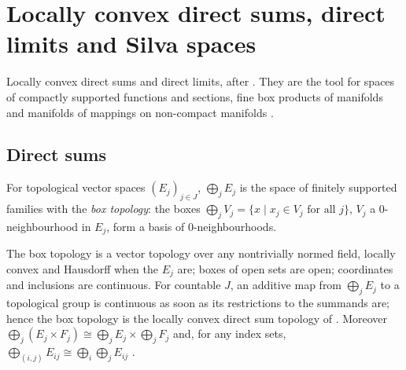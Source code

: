 \chapter{Locally convex direct sums, direct limits and Silva spaces}
\label{chap:directsums}

Locally convex direct sums and direct limits, after \cite[Appendix~B.13 and Sections~2.7--2.8]{GN26}.
They are the tool for spaces of compactly supported functions and sections, fine box products of
manifolds and manifolds of mappings on non-compact manifolds \cite[Sections~4.3--4.4]{GN26}.

\section{Direct sums}

\begin{definition}
  \label{def:ds-direct-sum}
  \leanok
  For topological vector spaces $(E_j)_{j \in J}$, $\bigoplus_j E_j$ is the space of finitely
  supported families with the \emph{box topology}: the boxes
  $\bigoplus_j V_j = \{x \mid x_j \in V_j \text{ for all } j\}$, $V_j$ a $0$-neighbourhood in $E_j$,
  form a basis of $0$-neighbourhoods.
\end{definition}

\begin{theorem}
  \label{thm:ds-basic}
  \leanok
  The box topology is a vector topology over any nontrivially normed field, locally convex and
  Hausdorff when the $E_j$ are; boxes of open sets are open; coordinates and inclusions are
  continuous. For countable $J$, an additive map from $\bigoplus_j E_j$ to a topological group is
  continuous as soon as its restrictions to the summands are; hence the box topology is the locally
  convex direct sum topology of \cite[(B.24)]{GN26}. Moreover
  $\bigoplus_j (E_j \times F_j) \cong \bigoplus_j E_j \times \bigoplus_j F_j$ and, for any index
  sets, $\bigoplus_{(i, j)} E_{ij} \cong \bigoplus_i \bigoplus_j E_{ij}$
  \cite[Lemma~B.13.2(b)]{GN26}.
\end{theorem}

